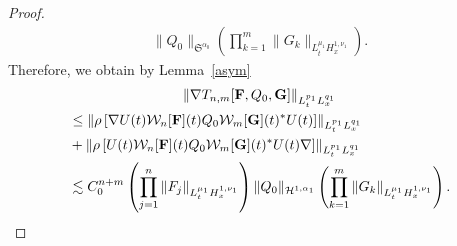 \documentclass[AHL,Unicode,longabstracts,MathTools,published]{cedram}
\newcommand{\vF}{{\mathbf{F}}}
\newcommand{\vG}{{\mathbf{G}}}
\newcommand{\CH}{\mathcal{H}}
\newcommand{\CW}{\mathcal{W}}
\newcommand{\FS}{\mathfrak{S}}
\newcommand{\al}{\alpha}
\newcommand{\rh}{\rho}
\newcommand{\Dk}[1]{\left[#1\right]}
\newcommand{\K}[1]{\left(#1\right)}
\renewcommand{\No}[1]{\left\| #1 \right\|}
\newcommand{\na}{\nabla}
\newcommand{\ls}{\lesssim}
\begin{document}
\begin{proof}
\begin{multline}
\|Q_0\|_{\FS^{\al_0}}
\K{\prod_{k=1}^m \|G_k\|_{L^{\mu_1}_t H^{1,\nu_1}_x}}. 
\end{multline}
Therefore, we obtain by Lemma~\ref{asym}
\begin{multline}
\left\|\na T_{n,m}[\vF,Q_0,\vG]\right\|_{L^{p_1}_t L^{q_1}_x} \\
\begin{aligned}
&\le \No{\rh \Dk{\na U(t) \CW_n[\vF](t) Q_0 \CW_m[\vG](t)^* U(t)}}_{L^{p_1}_t L^{q_1}_x} \\
&+ \No{\rh \Dk{U(t) \CW_n[\vF](t) Q_0 \CW_m[\vG](t)^* U(t) \na}}_{L^{p_1}_t L^{q_1}_x} \\
&\ls C_0^{n+m} \K{\prod_{j=1}^n \|F_j\|_{L^{\mu_1}_t H^{1,\nu_1}_x}} \|Q_0\|_{\CH^{1,\al_1}} \K{\prod_{k=1}^m \|G_k\|_{L^{\mu_1}_t H^{1,\nu_1}_x}}.\qedhere
\end{aligned}
\end{multline}
\end{proof}
\end{document}
